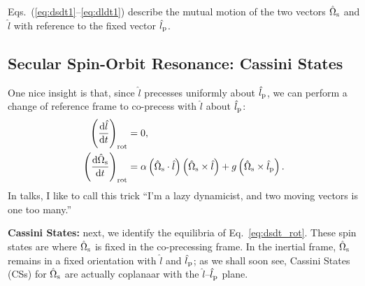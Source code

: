 \documentclass[11pt,
        usenames, %
        dvipsnames %
    ]{article}
\newcommand*{\rd}[2]{\frac{\mathrm{d}#1}{\mathrm{d}#2}}
\newcommand*{\p}[1]{\left(#1\right)}
\begin{document}
Eqs.~(\ref{eq:dsdt1}--\ref{eq:dldt1}) describe the mutual motion of the two
vectors $\hat{\Omega}_{\rm s}$ and $\hat{l}$ with reference to the fixed vector
$\hat{l}_{\rm p}$.

\subsection{Secular Spin-Orbit Resonance: Cassini States}

One nice insight is that, since $\hat{l}$ precesses uniformly about
$\hat{l}_{\rm p}$, we can perform a change of reference frame to co-precess with
$\hat{l}$ about $\hat{l}_{\rm p}$:
\begin{align}
    \p{\rd{\hat{l}}{t}}_{\rm rot} &= 0,\\
    \p{\rd{\hat{\Omega}_{\rm s}}{t}}_{\rm rot}
        &= \alpha\p{\hat{\Omega}_{\rm s} \cdot \hat{l}}
            \p{\hat{\Omega}_{\rm s} \times \hat{l}}
            + g\p{\hat{\Omega}_{\rm s} \times \hat{l}_{\rm
            p}}.\label{eq:dsdt_rot}
\end{align}
In talks, I like to call this trick ``I'm a lazy dynamicist, and two moving
vectors is one too many.''

\textbf{Cassini States:} next, we identify the equilibria of
Eq.~\eqref{eq:dsdt_rot}. These spin states are where $\hat{\Omega}_{\rm s}$ is
fixed in the co-precessing frame. In the inertial frame, $\hat{\Omega}_{\rm s}$
remains in a fixed orientation with $\hat{l}$ and $\hat{l}_{\rm p}$; as we shall
soon see, Cassini States (CSs) for $\hat{\Omega}_{\rm s}$ are actually coplanaar with
the $\hat{l}$--$\hat{l}_{\rm p}$ plane.
\end{document}
